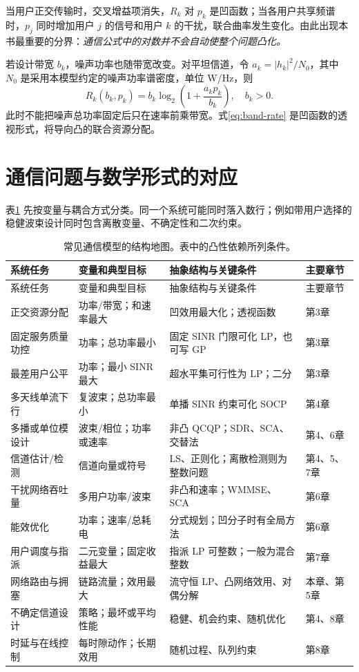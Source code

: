 当用户正交传输时，交叉增益项消失，$R_k$ 对 $p_k$ 是凹函数；当各用户共享频谱时，$p_j$ 同时增加用户 $j$ 的信号和用户 $k$ 的干扰，联合曲率发生变化。由此出现本书最重要的分界：\emph{通信公式中的对数并不会自动使整个问题凸化。}

若设计带宽 $b_k$，噪声功率也随带宽改变。对平坦信道，令 $a_k=|h_k|^2/N_0$，其中 $N_0$ 是采用本模型约定的噪声功率谱密度，单位 W/Hz，则
\begin{equation}\label{eq:band-rate}
 R_k(b_k,p_k)=b_k\log_2\left(1+\frac{a_kp_k}{b_k}\right),\quad b_k>0.
\end{equation}
此时不能把噪声总功率固定后只在速率前乘带宽。式\eqref{eq:band-rate} 是凹函数的透视形式，将导向凸的联合资源分配。

\section{通信问题与数学形式的对应}
表\ref{tab:map} 先按变量与耦合方式分类。同一个系统可能同时落入数行；例如带用户选择的稳健波束设计同时包含离散变量、不确定性和二次约束。

\begin{longtable}{p{}p{}p{}p{}}
\caption{常见通信模型的结构地图。表中的凸性依赖所列条件。}\label{tab:map}\\
\toprule 系统任务 & 变量和典型目标 & 抽象结构与关键条件 & 主要章节\\\midrule\endfirsthead
\toprule 系统任务 & 变量和典型目标 & 抽象结构与关键条件 & 主要章节\\\midrule\endhead
正交资源分配 & 功率/带宽；和速率最大 & 凹效用最大化；透视函数 & 第3章\\
固定服务质量功控 & 功率；总功率最小 & 固定 SINR 门限可化 LP，也可写 GP & 第3章\\
最差用户公平 & 功率；最小 SINR 最大 & 超水平集可行性为 LP；二分 & 第3章\\
多天线单流下行 & 复波束；总功率最小 & 单播 SINR 约束可化 SOCP & 第4章\\
多播或单位模设计 & 波束/相位；功率或速率 & 非凸 QCQP；SDR、SCA、交替法 & 第4、6章\\
信道估计/检测 & 信道向量或符号 & LS、正则化；离散检测则为整数问题 & 第4、5、7章\\
干扰网络吞吐量 & 多用户功率/波束 & 非凸和速率；WMMSE、SCA & 第6章\\
能效优化 & 功率；速率/总耗电 & 分式规划；凹分子时有全局方法 & 第6章\\
用户调度与指派 & 二元变量；固定收益最大 & 指派 LP 可整数；一般为混合整数 & 第7章\\
网络路由与拥塞 & 链路流量；效用最大 & 流守恒 LP、凸网络效用、对偶分解 & 本章、第5章\\
不确定信道设计 & 策略；最坏或平均性能 & 稳健、机会约束、随机优化 & 第4、8章\\
时延与在线控制 & 每时隙动作；长期效用 & 随机过程、队列约束 & 第8章\\\bottomrule
\end{longtable}

